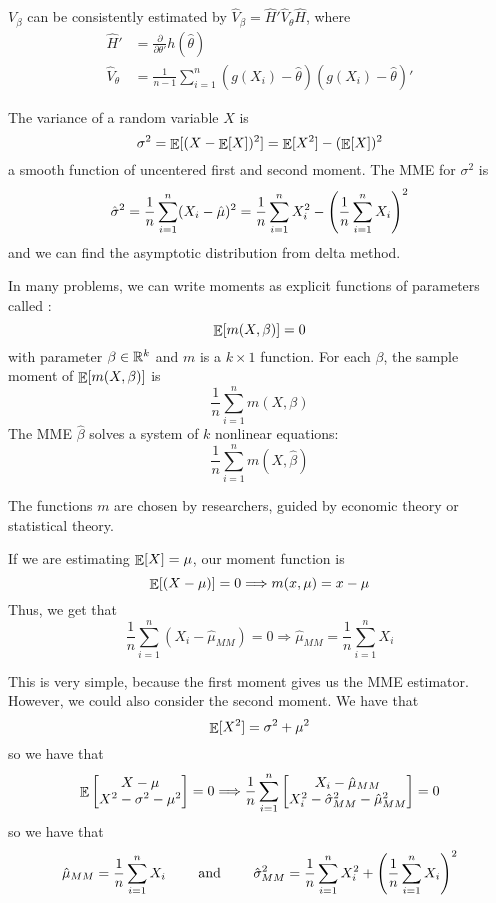 \documentclass[10pt]{article}
\begin{document}
$V_\beta$ can be consistently estimated by $\hat{V}_\beta = \hat{H}'\hat{V}_\theta \hat{H}$, where
\begin{align*}
	\hat{H}' &= \frac{\partial}{\partial \theta'} h(\hat{\theta}) \\
	\hat{V}_\theta &= \frac{1}{n-1} \sum_{i=1}^n (g(X_i) - \hat{\theta})(g(X_i) - \hat{\theta})'
\end{align*}

\begin{example}
	The variance of a random variable $X$ is
	\[
	\sigma^2 = \mathop{\mathbb{E}}[(X - \mathop{\mathbb{E}}[X])^2] = \mathop{\mathbb{E}}[X^2] - (\mathop{\mathbb{E}}[X])^2
	\]
	a smooth function of uncentered first and second moment. The MME for $\sigma^2$ is
	\[
	\hat{\sigma}^2 = \frac{1}{n} \sum_{i=1}^n (X_i - \hat{\mu})^2 = \frac{1}{n}\sum_{i=1}^n X_i^2 - \left( \frac{1}{n}\sum_{i=1}^n X_i\right)^2
	\]
	and we can find the asymptotic distribution from delta method.
\end{example}


\begin{definition}
	In many problems, we can write moments as explicit functions of parameters called :
	\[
	\mathop{\mathbb{E}}[m(X,\beta)] = 0
	\]
	with parameter $\beta \in \mathbb{R}^k$ and $m$ is a $k \times 1$ function. For each $\beta$, the sample moment of $\mathop{\mathbb{E}}[m(X,\beta)]$ is
	\[
	\frac{1}{n}\sum_{i=1}^n m(X,\beta)
	\]
	The MME $\hat{\beta}$ solves a system of $k$ nonlinear equations:
	\[
	\frac{1}{n}\sum_{i=1}^n m(X,\hat{\beta})
	\]
\end{definition}

\begin{remark}
	The functions $m$ are chosen by researchers, guided by economic theory or statistical theory.
\end{remark}


\begin{example}
	If we are estimating $\mathop{\mathbb{E}}[X] = \mu$, our moment function is
	\[
	\mathop{\mathbb{E}}[(X - \mu)] = 0 \Longrightarrow m(x,\mu) = x - \mu
	\]
	Thus, we get that
	\[
	\frac{1}{n}\sum_{i=1}^n (X_i - \hat{\mu}_{MM}) = 0 \Longrightarrow \hat{\mu}_{MM} = \frac{1}{n}\sum_{i=1}^n X_i
	\]
	
	This is very simple, because the first moment gives us the MME estimator. However, we could also consider the second moment. We have that
	\[
	\mathop{\mathbb{E}}[X^2] = \sigma^2 + \mu^2
	\]
	so we have that
	\[
	\mathop{\mathbb{E}} \begin{bmatrix}X - \mu \\ X^2 - \sigma^2 - \mu^2\end{bmatrix} = 0 \Longrightarrow \frac{1}{n}\sum_{i=1}^n \begin{bmatrix}X_i - \hat{\mu}_{MM} \\ X_i^2 - \hat{\sigma}_{MM}^2 - \hat{\mu}_{MM}^2\end{bmatrix} = 0
	\]
	so we have that
	\[
	\hat{\mu}_{MM} = \frac{1}{n}\sum_{i=1}^n X_i \qquad \text{ and } \qquad \hat{\sigma}^2_{MM} = \frac{1}{n}\sum_{i=1}^n X_i^2 + \left( \frac{1}{n}\sum_{i=1}^n X_i\right)^2
	\]
\end{example}
\end{document}

